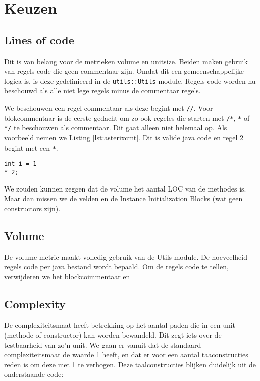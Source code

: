 \documentclass[a4paper]{article}
\begin{document}
\section{Keuzen}
\subsection{Lines of code}
Dit is van belang voor de metrieken volume en unitsize. Beiden
maken gebruik van regels code die geen commentaar zijn. Omdat
dit een gemeenschappelijke logica is, is deze gedefinieerd in de
\texttt{utils::Utils} module.
Regels code worden nu beschouwd als alle niet lege regels minus
de commentaar regels.

We beschouwen een regel commentaar als deze begint met
\lstinline{//}. Voor blokcommentaar is de eerste gedacht om zo
ook regeles die starten met \lstinline{/*}, \lstinline{*} of
\lstinline{*/} te beschouwen als commentaar. Dit gaat alleen
niet helemaal op. Als voorbeeld nemen we Listing
\ref{lst:asterixcmt}. Dit is valide java code en regel 2 begint
met een \lstinline{*}.

\begin{lstlisting}[caption={* als commentaar
beschouwen},label={lst:asterixcmt},escapechar=|, frame = single]
int i = 1
* 2;
\end{lstlisting}

We zouden kunnen zeggen dat de volume het aantal LOC van de
methodes is. Maar dan missen we de velden en de Instance
Initialization Blocks (wat geen constructors zijn).

\subsection{Volume}
De volume metric maakt volledig gebruik van de Utils module. De
hoeveelheid regels code per java bestand wordt bepaald. Om de
regels code te tellen, verwijderen we het blockcoimmentaar en

\subsection{Complexity}
De complexiteitsmaat heeft betrekking op het aantal paden die in
een unit (methode of constructor) kan worden bewandeld. Dit zegt
iets over de testbaarheid van zo'n unit. We gaan er vanuit dat
de standaard complexiteitsmaat de waarde 1 heeft, en dat er voor
een aantal taaconstructies reden is om deze met 1 te verhogen.
Deze taalconstructies blijken duidelijk uit de onderstaande
code:
\end{document}
